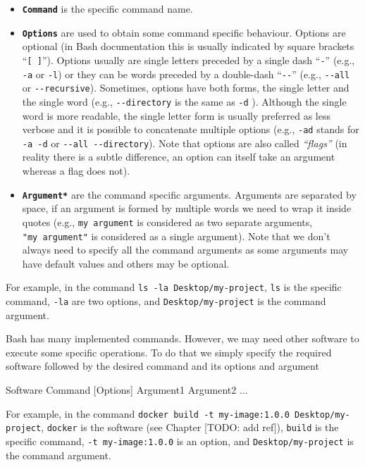 \documentclass[
  11pt,
]{book}
\newenvironment{Shaded}{\begin{snugshade}}{\end{snugshade}}
\newcommand{\ExtensionTok}[1]{#1}
\newcommand{\NormalTok}[1]{#1}
\providecommand{\tightlist}{%
  \setlength{\itemsep}{0pt}\setlength{\parskip}{0pt}}
\begin{document}
\begin{itemize}
\tightlist
\item
  \textbf{\texttt{Command}} is the specific command name.
\item
  \textbf{\texttt{Options}} are used to obtain some command specific behaviour. Options are optional (in Bash documentation this is usually indicated by square brackets ``\texttt{{[}\ {]}}''). Options usually are single letters preceded by a single dash ``\texttt{-}'' (e.g., \texttt{-a} or \texttt{-l}) or they can be words preceded by a double-dash ``\texttt{-\/-}'' (e.g., \texttt{-\/-all} or \texttt{-\/-recursive}). Sometimes, options have both forms, the single letter and the single word (e.g., \texttt{-\/-directory} is the same as \texttt{-d} ). Although the single word is more readable, the single letter form is usually preferred as less verbose and it is possible to concatenate multiple options (e.g., \texttt{-ad} stands for \texttt{-a\ -d} or \texttt{-\/-all\ -\/-directory}). Note that options are also called \emph{``flags''} (in reality there is a subtle difference, an option can itself take an argument whereas a flag does not).
\item
  \textbf{\texttt{Argument*}} are the command specific arguments. Arguments are separated by space, if an argument is formed by multiple words we need to wrap it inside quotes (e.g., \texttt{my\ argument} is considered as two separate arguments, \texttt{"my\ argument"} is considered as a single argument). Note that we don't always need to specify all the command arguments as some arguments may have default values and others may be optional.
\end{itemize}

For example, in the command \texttt{ls\ -la\ Desktop/my-project}, \texttt{ls} is the specific command, \texttt{-la} are two options, and \texttt{Desktop/my-project} is the command argument.

Bash has many implemented commands. However, we may need other software to execute some specific operations. To do that we simply specify the required software followed by the desired command and its options and argument

\begin{Shaded}
\begin{Highlighting}[]
\ExtensionTok{Software}\NormalTok{ Command [Options] Argument1 Argument2 ...}
\end{Highlighting}
\end{Shaded}

For example, in the command \texttt{docker\ build\ -t\ my-image:1.0.0\ Desktop/my-project}, \texttt{docker} is the software (see Chapter {[}TODO: add ref{]}), \texttt{build} is the specific command, \texttt{-t\ my-image:1.0.0} is an option, and \texttt{Desktop/my-project} is the command argument.
\end{document}

